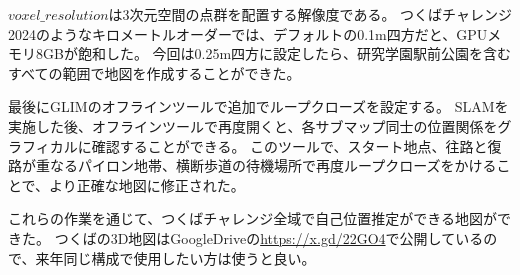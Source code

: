 $voxel\_resolution$は3次元空間の点群を配置する解像度である。
つくばチャレンジ2024のようなキロメートルオーダーでは、デフォルトの0.1m四方だと、GPUメモリ8GBが飽和した。
今回は0.25m四方に設定したら、研究学園駅前公園を含むすべての範囲で地図を作成することができた。

最後にGLIMのオフラインツールで追加でループクローズを設定する。
SLAMを実施した後、オフラインツールで再度開くと、各サブマップ同士の位置関係をグラフィカルに確認することができる。
このツールで、スタート地点、往路と復路が重なるパイロン地帯、横断歩道の待機場所で再度ループクローズをかけることで、より正確な地図に修正された。

これらの作業を通じて、つくばチャレンジ全域で自己位置推定ができる地図ができた。
つくばの3D地図はGoogleDriveの\url{https://x.gd/22GO4}で公開しているので、来年同じ構成で使用したい方は使うと良い。